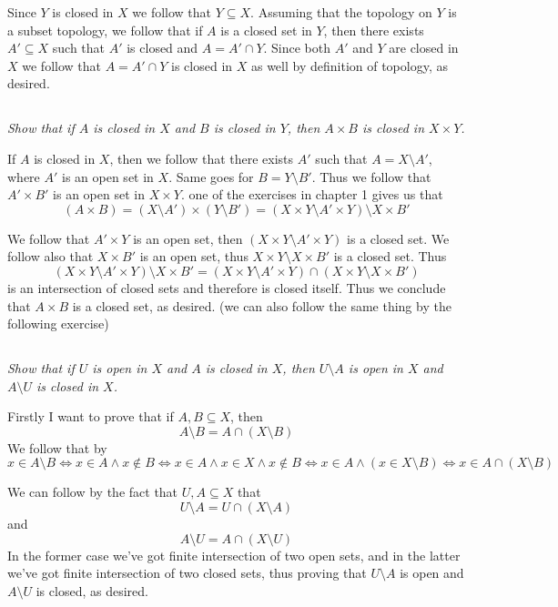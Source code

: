 \documentclass[11pt,oneside,titlepage]{book}
\DeclareMathOperator \lra {\Leftrightarrow}
\begin{document}
Since $Y$ is closed in $X$  we follow that $Y \subseteq X$. Assuming that the
topology on $Y$ is a subset topology, we follow that if $A$ is a closed set in $Y$,
then there exists $A' \subseteq X$ such that $A'$ is closed and $A = A' \cap Y$.
Since both $A'$ and $Y$ are closed in $X$ we follow that $A = A' \cap Y$ is closed in $X$
as well by definition of topology, as desired.

\subsection{}

\textit{Show that if $A$ is closed in $X$ and $B$ is closed in $Y$, then $A \times B$
  is closed in $X \times Y$.}

If $A$ is closed in $X$, then we follow that there exists $A'$ such that
$A = X \setminus A'$, where $A'$ is an open set in $X$. Same goes for $B = Y \setminus B'$.
Thus we follow that $A' \times B'$ is an open set in $X \times Y$. 
one of the exercises in chapter 1 gives us that
$$(A \times B) = (X \setminus A') \times (Y \setminus B') =
(X \times Y \setminus A' \times Y) \setminus X \times B'$$

We follow that $A' \times Y$ is an open set, then $(X \times Y \setminus A' \times Y)$
is a closed set. We follow also that $X \times B'$ is an open set,
thus $X \times Y \setminus X \times B'$ is a closed set. Thus
$$(X \times Y \setminus A' \times Y) \setminus X \times B' =
(X \times Y \setminus A' \times Y) \cap (X \times Y \setminus  X \times B')$$
is an intersection of closed sets and therefore is closed itself. Thus
we conclude that $A \times B$ is a closed set, as desired. (we can also follow the same thing
by the following exercise)

\subsection{}

\textit{Show that if $U$ is open in $X$ and $A$ is closed in $X$, then
  $U \setminus A$ is open in $X$ and $A \setminus U$ is closed in $X$.}


Firstly I want to prove that if $A, B \subseteq X$, then
$$A \setminus B = A \cap (X \setminus B)$$
We follow that by
$$x \in A \setminus B \lra x \in A \land x \notin B \lra x \in A \land x \in X \land x \notin B
\lra x \in A \land (x \in X \setminus B) \lra x \in A \cap (X \setminus B)$$

We can follow by the fact that $U, A \subseteq X$ that 
$$U \setminus A = U \cap (X \setminus A)$$
and
$$A \setminus U = A \cap (X \setminus U)$$
In the former case we've got finite intersection of two open sets,
and in the latter we've got finite intersection of two closed sets,
thus proving that $U \setminus A$ is open and $A \setminus U$ is closed, as desired.
\end{document}
